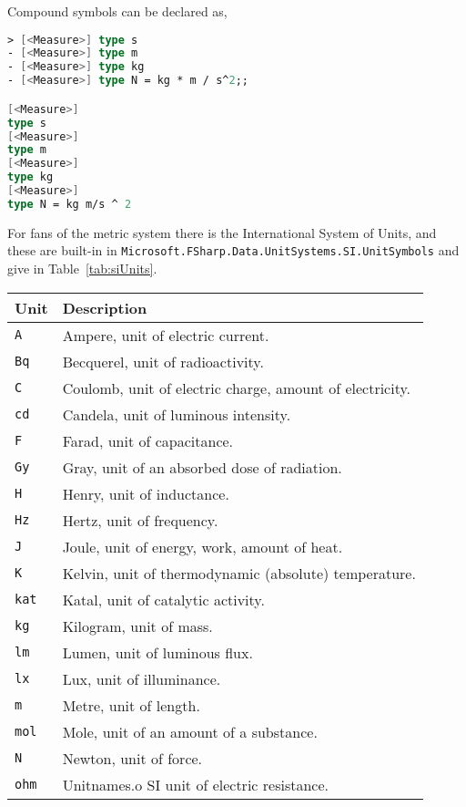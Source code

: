 Compound symbols can be declared as,
%
\begin{lstlisting}[language=fsharp,caption={fsharpi, aggregated unit of measures.}]
> [<Measure>] type s         
- [<Measure>] type m
- [<Measure>] type kg
- [<Measure>] type N = kg * m / s^2;;

[<Measure>]
type s
[<Measure>]
type m
[<Measure>]
type kg
[<Measure>]
type N = kg m/s ^ 2
\end{lstlisting}
For fans of the metric system there is the International System of Units, and these are built-in in \lstinline|Microsoft.FSharp.Data.UnitSystems.SI.UnitSymbols| and give in Table~\ref{tab:siUnits}.
\begin{table}
  \centering
  \begin{tabularx}{0.75\linewidth}{|l|X|}
    \hline
    Unit & Description \\
    \hline
    \lstinline|A| & Ampere, unit of electric current.\\
    \lstinline|Bq|&Becquerel, unit of radioactivity.\\
    \lstinline|C|&Coulomb, unit of electric charge, amount of electricity.\\
    \lstinline|cd|&Candela, unit of luminous intensity.\\
    \lstinline|F|&Farad, unit of capacitance.\\
    \lstinline|Gy|&Gray, unit of an absorbed dose of radiation.\\
    \lstinline|H|&Henry, unit of inductance.\\
    \lstinline|Hz|&Hertz, unit of frequency.\\
    \lstinline|J|&Joule, unit of energy, work, amount of heat.\\
    \lstinline|K|&Kelvin, unit of thermodynamic (absolute) temperature.\\
    \lstinline|kat|&Katal, unit of catalytic activity.\\
    \lstinline|kg|&Kilogram, unit of mass.\\
    \lstinline|lm|&Lumen, unit of luminous flux.\\
    \lstinline|lx|&Lux, unit of illuminance.\\
    \lstinline|m|&Metre, unit of length.\\
    \lstinline|mol|&Mole, unit of an amount of a substance.\\
    \lstinline|N|&Newton, unit of force.\\
    \lstinline|ohm|&Unitnames.o SI unit of electric resistance.\\

\end{tabularx}
\end{table}
